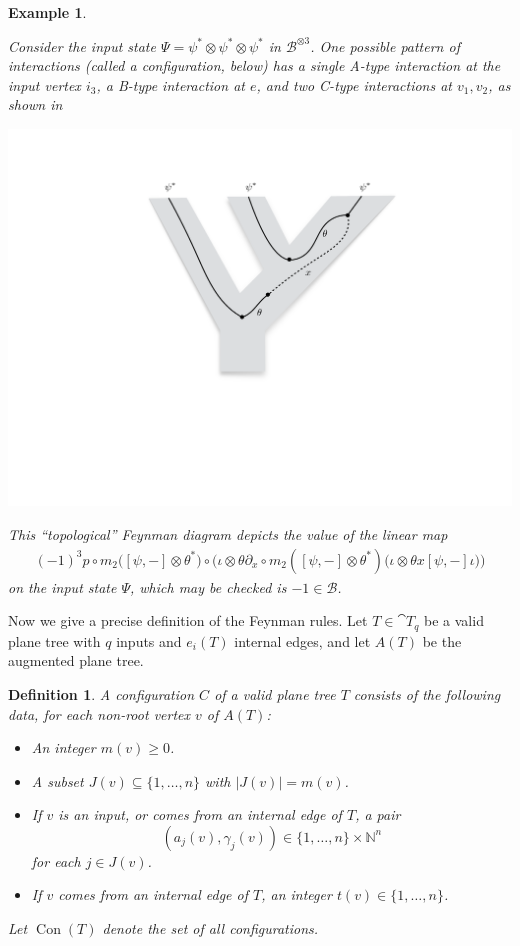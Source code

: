 \documentclass[english,letter paper,12pt,leqno]{article}
\theoremstyle{example}
\newtheorem{definition}[theorem]{Definition}
\newtheorem{example}[theorem]{Example}
\numberwithin{equation}{section}
\begin{document}
\begin{example}
\begin{center}
\end{center}
Consider the input state $\Psi = \psi^* \otimes \psi^* \otimes \psi^*$ in $\mathscr{B}^{\otimes 3}$. One possible pattern of interactions (called a configuration, below) has a single A-type interaction at the input vertex $i_3$, a B-type interaction at $e$, and two C-type interactions at $v_1,v_2$, as shown in
\begin{center}
\includegraphics[scale=0.3]{dia6}
\end{center}
This ``topological'' Feynman diagram depicts the value of the linear map
\begin{align*}
(-1)^3 p \circ m_2 \big([\psi, -] \otimes \theta^*\big) \circ \big( \iota \otimes \theta \partial_x \circ m_2 ([\psi, -] \otimes \theta^*)\big( \iota \otimes \theta x [\psi, -] \iota \big)\big)
\end{align*}
on the input state $\Psi$, which may be checked is $-1 \in \mathscr{B}$.
\end{example}

Now we give a precise definition of the Feynman rules. Let $T \in \cat{T}_q$ be a valid plane tree with $q$ inputs and $e_i(T)$ internal edges, and let $A(T)$ be the augmented plane tree. 

\begin{definition}\label{defn:config} A \emph{configuration} $C$ of a valid plane tree $T$ consists of the following data, for each non-root vertex $v$ of $A(T)$:
\begin{itemize}
\item An integer $m(v) \ge 0$.
\item A subset $J(v) \subseteq \{ 1,\ldots, n \}$ with $|J(v)| = m(v)$. 
\item If $v$ is an input, or comes from an internal edge of $T$, a pair
\[
( a_j(v), \gamma_j(v) ) \in \{ 1, \ldots, n \} \times \mathbb{N}^n
\]
for each $j \in J(v)$.
\item If $v$ comes from an internal edge of $T$, an integer $t(v) \in \{1,\ldots,n\}$.
\end{itemize}
Let $\operatorname{Con}(T)$ denote the set of all configurations.
\end{definition} 
\end{document}
